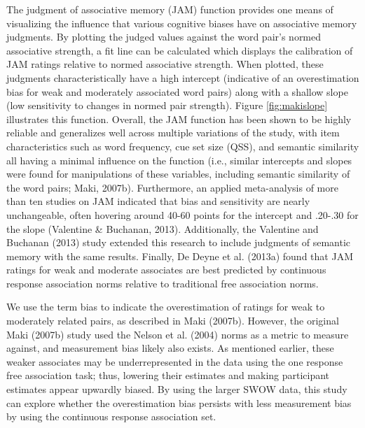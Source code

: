 \documentclass[english,,man]{apa6}
\begin{document}
The judgment of associative memory (JAM) function provides one means of visualizing the influence that various cognitive biases have on associative memory judgments. By plotting the judged values against the word pair's normed associative strength, a fit line can be calculated which displays the calibration of JAM ratings relative to normed associative strength. When plotted, these judgments characteristically have a high intercept (indicative of an overestimation bias for weak and moderately associated word pairs) along with a shallow slope (low sensitivity to changes in normed pair strength). Figure \ref{fig:makislope} illustrates this function. Overall, the JAM function has been shown to be highly reliable and generalizes well across multiple variations of the study, with item characteristics such as word frequency, cue set size (QSS), and semantic similarity all having a minimal influence on the function (i.e., similar intercepts and slopes were found for manipulations of these variables, including semantic similarity of the word pairs; Maki, 2007b). Furthermore, an applied meta-analysis of more than ten studies on JAM indicated that bias and sensitivity are nearly unchangeable, often hovering around 40-60 points for the intercept and .20-.30 for the slope (Valentine \& Buchanan, 2013). Additionally, the Valentine and Buchanan (2013) study extended this research to include judgments of semantic memory with the same results. Finally, De Deyne et al. (2013a) found that JAM ratings for weak and moderate associates are best predicted by continuous response association norms relative to traditional free association norms.

We use the term bias to indicate the overestimation of ratings for weak to moderately related pairs, as described in Maki (2007b). However, the original Maki (2007b) study used the Nelson et al. (2004) norms as a metric to measure against, and measurement bias likely also exists. As mentioned earlier, these weaker associates may be underrepresented in the data using the one response free association task; thus, lowering their estimates and making participant estimates appear upwardly biased. By using the larger SWOW data, this study can explore whether the overestimation bias persists with less measurement bias by using the continuous response association set.
\end{document}
